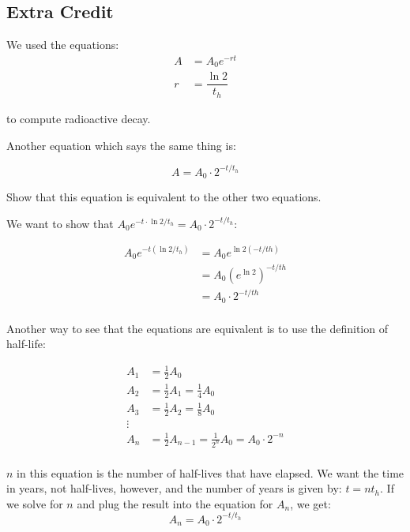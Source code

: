 \documentclass[fleqn,addpoints]{exam}
\begin{document}
\begin{questions}
 
\ifprintanswers
\else
\pagebreak
\fi

\section{Extra Credit}
\bonusquestion[10]

We used the equations:
\begin{align*}
  A &= A_0 e^{-rt} \\
  r &= \dfrac{\ln 2}{t_h}
\end{align*}

to compute radioactive decay.  

Another equation which says the same thing is:

\[
  A = A_0 \cdot 2^{-t/t_h}
\]

Show that this equation is equivalent to the other two equations.

\begin{solution}[5 cm]
We want to show that $A_0 e^{-t \cdot \ln 2/t_h} = A_0 \cdot 2^{-t/t_h}$:

\begin{align*}
  A_0 e^{-t (\ln 2/t_h)} &= A_0 e^{\ln 2 (-t/th)}  \\
  &= A_0 \left( e^{\ln 2} \right)^{-t/th}  \\
  &= A_0 \cdot 2^{-t/th}  \\
\end{align*}

Another way to see that the equations are equivalent is to use the definition of half-life:

\begin{align*}
  A_1 &= \frac{1}{2} A_0 \\
  A_2 &= \frac{1}{2} A_1 = \frac{1}{4} A_0 \\
  A_3 &= \frac{1}{2} A_2 = \frac{1}{8} A_0 \\
  \vdots \\
  A_n &= \frac{1}{2} A_{n-1} = \frac{1}{2^n} A_0 = A_0 \cdot 2^{-n} \\
\end{align*}

$n$ in this equation is the number of half-lives that have elapsed.  We want the time in years, not half-lives, however,
and the number of years is given by: $t = nt_h$.  If we solve for $n$ and plug the result into
the equation for $A_n$, we get: 
\[
  A_n = A_0 \cdot 2^{-t/t_h}
\]
 
\end{solution}

\end{questions}
\end{document}

